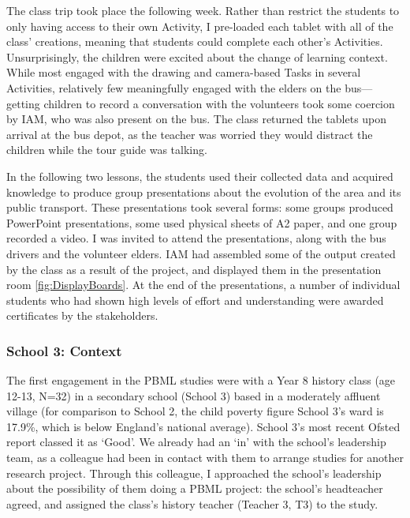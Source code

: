 The class trip took place the following week. Rather than restrict the students to only having access to their own Activity, I pre-loaded each tablet with all of the class' creations, meaning that students could complete each other's Activities. Unsurprisingly, the children were excited about the change of learning context. While most engaged with the drawing and camera-based Tasks in several Activities, relatively few meaningfully engaged with the elders on the bus---getting children to record a conversation with the volunteers took some coercion by IAM, who was also present on the bus. The class returned the tablets upon arrival at the bus depot, as the teacher was worried they would distract the children while the tour guide was talking.

In the following two lessons, the students used their collected data and acquired knowledge to produce group presentations about the evolution of the area and its public transport. These presentations took several forms: some groups produced PowerPoint presentations, some used physical sheets of A2 paper, and one group recorded a video. I was invited to attend the presentations, along with the bus drivers and the volunteer elders. IAM had assembled some of the output created by the class as a result of the project, and displayed them in the presentation room \ref{fig:DisplayBoards}. At the end of the presentations, a number of individual students who had shown high levels of effort and understanding were awarded certificates by the stakeholders.


\subsubsection{School 3: Context}
The first engagement in the PBML studies were with a Year 8 history class (age 12-13, N=32) in a secondary school (School 3) based in a moderately affluent village (for comparison to School 2, the child poverty figure School 3's ward is 17.9\%, which is below England's national average). School 3's most recent Ofsted report classed it as `Good'. We already had an `in' with the school's leadership team, as a colleague had been in contact with them to arrange studies for another research project. Through this colleague, I approached the school's leadership about the possibility of them doing a PBML project: the school's headteacher agreed, and assigned the class's history teacher (Teacher 3, T3) to the study. 


